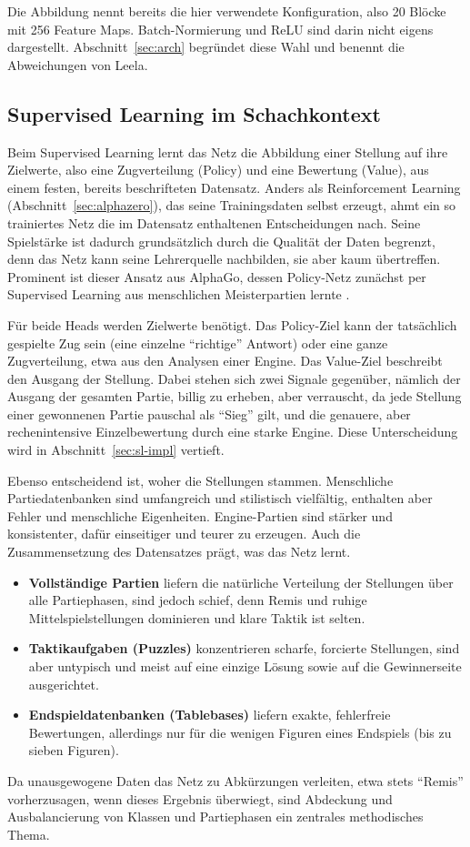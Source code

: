 \documentclass[
  a4paper, 12pt,
  parskip=half,
  headings=small,
  bibliography=totoc
]{scrartcl}
\begin{document}
Die Abbildung nennt bereits die hier verwendete Konfiguration, also 20 Blöcke mit
256 Feature Maps. Batch-Normierung und ReLU sind darin nicht eigens dargestellt.
Abschnitt~\ref{sec:arch} begründet diese Wahl und benennt die Abweichungen von
Leela.

\subsection{Supervised Learning im Schachkontext}\label{sec:sl-context}
Beim Supervised Learning lernt das Netz die Abbildung einer
Stellung auf ihre Zielwerte, also eine Zugverteilung (Policy) und eine Bewertung
(Value), aus einem festen, bereits beschrifteten Datensatz. Anders als
Reinforcement Learning (Abschnitt~\ref{sec:alphazero}), das seine Trainingsdaten
selbst erzeugt, ahmt ein so trainiertes Netz die im Datensatz enthaltenen
Entscheidungen nach. Seine Spielstärke ist dadurch grundsätzlich durch die
Qualität der Daten begrenzt, denn das Netz kann seine Lehrerquelle
nachbilden, sie aber kaum übertreffen. Prominent ist dieser Ansatz aus AlphaGo, dessen
Policy-Netz zunächst per Supervised Learning aus menschlichen Meisterpartien lernte
\parencite{silver2016}.

Für beide Heads werden Zielwerte benötigt. Das Policy-Ziel kann der tatsächlich
gespielte Zug sein (eine einzelne \enquote{richtige} Antwort) oder eine ganze
Zugverteilung, etwa aus den Analysen einer Engine. Das Value-Ziel beschreibt den
Ausgang der Stellung. Dabei stehen sich zwei Signale gegenüber, nämlich der
Ausgang der gesamten Partie, billig zu erheben, aber verrauscht, da jede Stellung
einer gewonnenen Partie pauschal als \enquote{Sieg} gilt, und die genauere, aber
rechenintensive Einzelbewertung durch eine starke Engine. Diese Unterscheidung
wird in Abschnitt~\ref{sec:sl-impl} vertieft.

Ebenso entscheidend ist, woher die Stellungen stammen. Menschliche
Partiedatenbanken sind umfangreich und stilistisch vielfältig, enthalten aber
Fehler und menschliche Eigenheiten. Engine-Partien sind stärker und konsistenter,
dafür einseitiger und teurer zu erzeugen. Auch die Zusammensetzung des Datensatzes
prägt, was das Netz lernt.
\begin{itemize}
  \item \textbf{Vollständige Partien} liefern die natürliche Verteilung der
        Stellungen über alle Partiephasen, sind jedoch schief, denn Remis und
        ruhige Mittelspielstellungen dominieren und klare Taktik ist selten.
  \item \textbf{Taktikaufgaben (Puzzles)} konzentrieren scharfe, forcierte
        Stellungen, sind aber untypisch und meist auf eine einzige Lösung sowie
        auf die Gewinnerseite ausgerichtet.
  \item \textbf{Endspieldatenbanken (Tablebases)} liefern exakte, fehlerfreie
        Bewertungen, allerdings nur für die wenigen Figuren eines Endspiels
        (bis zu sieben Figuren).
\end{itemize}
Da unausgewogene Daten das Netz zu Abkürzungen verleiten, etwa stets
\enquote{Remis} vorherzusagen, wenn dieses Ergebnis überwiegt, sind Abdeckung
und Ausbalancierung von Klassen und Partiephasen ein zentrales methodisches Thema.
\end{document}
